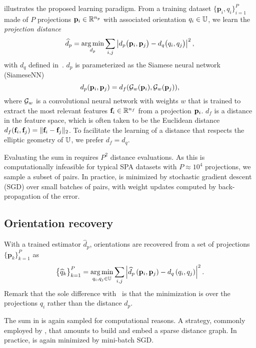  illustrates the proposed learning paradigm.
From a training dataset $\{ \mathbf{p}_{i}, q_i\}_{i=1}^{P}$ made of $P$ projections $\mathbf{p}_i \in \mathbb{R}^{n_p}$ with associated orientation $q_i \in \mathbb{U}$, we learn the \textit{projection distance}
\begin{equation}
    \widehat{d}_p = \operatorname*{arg\,min}_{d_p} \sum_{i,j} \left| d_p\big(\mathbf{p}_{i},\mathbf{p}_{j}\big) - d_q\big(q_i,q_j\big) \right|^2,
    \label{eqn:distance-learning}
\end{equation}
with $d_q$ defined in~.
$d_p$ is parameterized as the Siamese neural network (SiameseNN)~\cite{chopra2005learning} 
\begin{equation}
    d_p(\mathbf{p}_i, \mathbf{p}_j) = d_f(\mathcal{G}_w(\mathbf{p}_i), \mathcal{G}_w(\mathbf{p}_j)),
    \label{eqn:distance:projections}
\end{equation}
where $\mathcal{G}_w$ is a convolutional neural network with weights $w$ that is trained to extract the most relevant features $\mathbf{f}_i \in \mathbb{R}^{n_f}$ from a projection $\mathbf{p}_i$.
$d_f$ is a distance in the feature space, which is often taken to be the Euclidean distance $d_f(\mathbf{f}_i, \mathbf{f}_j) = \Vert \mathbf{f}_i - \mathbf{f}_j \Vert_2$.
To facilitate the learning of a distance that respects the elliptic geometry of $\mathbb{U}$, we prefer $d_f = d_q$.

Evaluating the sum in  requires $P^2$ distance evaluations.
As this is computationally infeasible for typical SPA datasets with $P \approx 10^4$ projections, we sample a subset of pairs.
In practice,  is minimized by stochastic gradient descent (SGD) over small batches of pairs, with weight updates computed by back-propagation of the error.

\subsection{Orientation recovery}\label{sec:method:orientation-recovery}

With a trained estimator $\widehat{d}_p$, orientations are recovered from a set of projections $\big\{ \mathbf{p}_k \big\}_{k=1}^P$ as
\begin{equation}
    \big\{ \widehat{q}_k \big\}_{k=1}^P = \operatorname*{arg\,min}_{q_i, q_j \in \mathbb{U}} \sum_{i,j} \left| \widehat{d}_p \left( \mathbf{p}_i, \mathbf{p}_j \right) - d_q\left(q_i,q_j\right) \right|^2.
    \label{eqn:orientation-recovery}
\end{equation}
Remark that the sole difference with~ is that the minimization is over the projections $q_i$ rather than the distance $d_p$.

The sum in  is again sampled for computational reasons.
A strategy, commonly employed by , that amounts to build and embed a sparse distance graph.
In practice,  is again minimized by mini-batch SGD.
